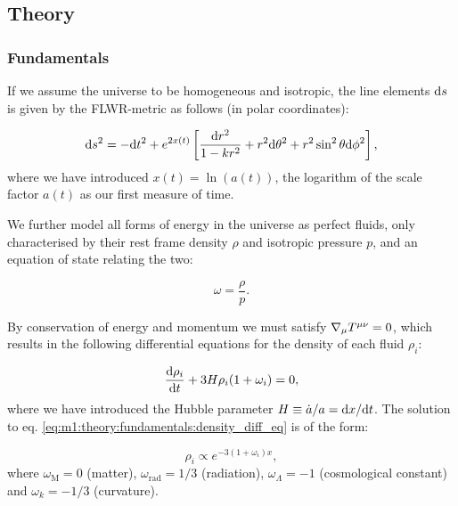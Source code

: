 \subsection{Theory}\label{sec:m1:theory}

\subsubsection{Fundamentals}\label{sec:m1:theory:fundamentals}

    If we assume the universe to be homogeneous and isotropic, the line elements $\mathrm{d} s$ is given by the FLWR-metric as follows (in polar coordinates)\cite[eq. 1.1.11]{weinberg2008cosmology}:

    \begin{equation}\label{eq:m1:theory:fundamentals:FLWR_line_element}
        \mathrm{d} s^2 = -\mathrm{d} t^2 + e^{2x(t)}\left[ \frac{\mathrm{d} r^2}{1-kr^2}+r^2\mathrm{d}\theta^2 + r^2\sin^2\theta\mathrm{d}\phi^2 \right],
    \end{equation}
    where we have introduced $x(t) = \ln(a(t))$, the logarithm of the scale factor $a(t)$  as our first measure of time. 

    We further model all forms of energy in the universe as perfect fluids, only characterised by their rest frame density $\rho$ and isotropic pressure $p$, and an equation of state relating the two:

    \begin{equation}\label{eq:m1:theory:fundamentals:equation_of_state}
        \omega=\frac{\rho}{p}.
    \end{equation}

    By conservation of energy and momentum we must satisfy $\nabla_\mu T^{\mu\nu}=0$, which results in the following differential equations for the density  of each fluid $\rho_i$:

    \begin{equation}\label{eq:m1:theory:fundamentals:density_diff_eq}
        \dv{\rho_i}{t} +3H\rho_i(1+\omega_i) = 0,
    \end{equation}
    where we have introduced the Hubble parameter $H \equiv\dot{a}/a=\mathrm{d} x/\mathrm{d} t$. The solution to eq. \ref{eq:m1:theory:fundamentals:density_diff_eq} is of the form:

    \begin{equation}\label{eq:m1:theory:fundamentals:solution_to_density_diff_eq}
        \rho_i \propto e^{-3(1+\omega_i)x},
    \end{equation}
    where $\omega_\mathrm{M} = 0$ (matter), $\omega_\mathrm{rad}=1/3$ (radiation), $\omega_\Lambda=-1$ (cosmological constant) and $\omega_k=-1/3$ (curvature). 

